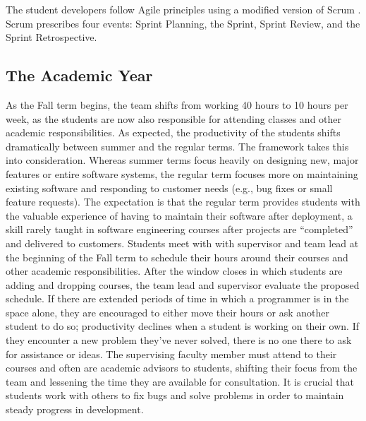 The student developers follow Agile principles \cite{agilemanifesto} using a modified version of Scrum \cite{thescrumguide}. Scrum prescribes four events: Sprint Planning, the Sprint, Sprint Review, and the Sprint Retrospective. 

\subsection{The Academic Year}
As the Fall term begins, the team shifts from working 40 hours to 10 hours per week, as the students are now also responsible for attending classes and other academic responsibilities. As expected, the productivity of the students shifts dramatically between summer and the regular terms. The framework takes this into consideration. Whereas summer terms focus heavily on designing new, major features or entire software systems, the regular term focuses more on maintaining existing software and responding to customer needs (e.g., bug fixes or small feature requests). The expectation is that the regular term provides students with the valuable experience of having to maintain their software after deployment, a skill rarely taught in software engineering courses after projects are ``completed'' and delivered to customers.
Students meet with with supervisor and team lead at the beginning of the Fall term to schedule their hours around their courses and other academic responsibilities. After the window closes in which students are adding and dropping courses, the team lead and supervisor evaluate the proposed schedule. If there are extended periods of time in which a programmer is in the space alone, they are encouraged to either move their hours or ask another student to do so; productivity declines when a student is working on their own. If they encounter a new problem they've never solved, there is no one there to ask for assistance or ideas. The supervising faculty member must attend to their courses and often are academic advisors to students, shifting their focus from the team and lessening the time they are available for consultation. It is crucial that students work with others to fix bugs and solve problems in order to maintain steady progress in development.
